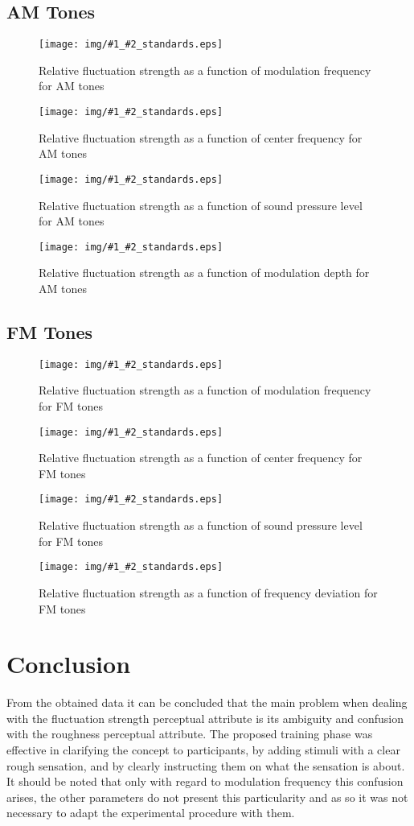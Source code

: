 \documentclass[a4paper]{article}
\newcommand{\figStds}[3]{
\begin{figure}[ht!]
  \centering
  \texttt{[image: img/\#1\_\#2\_standards.eps]}
  \caption{#3}
\label{fig:#1-#2}
\end{figure}
}
\begin{document}
\subsection{AM Tones} %
\label{subsec:results_am_tones}

\figStds{AM-fm}
  {all}
  {Relative fluctuation strength as a function of modulation frequency for AM
  tones}

\figStds{AM-fc}
  {all}
  {Relative fluctuation strength as a function of center frequency for AM
  tones}

\figStds{AM-SPL}
  {all}
  {Relative fluctuation strength as a function of sound pressure level for AM
  tones}

\figStds{AM-md}
  {all}
  {Relative fluctuation strength as a function of modulation depth for AM
  tones}


\subsection{FM Tones} %
\label{subsec:results_fm_tones}

\figStds{FM-fm}
  {all}
  {Relative fluctuation strength as a function of modulation frequency for FM
  tones}

\figStds{FM-fc}
  {all}
  {Relative fluctuation strength as a function of center frequency for FM
  tones}

\figStds{FM-SPL}
  {all}
  {Relative fluctuation strength as a function of sound pressure level for FM
  tones}

\figStds{FM-df}
  {all}
  {Relative fluctuation strength as a function of frequency deviation for FM
  tones}



\section{Conclusion} %
\label{sec:conclusion}

From the obtained data it can be concluded that the main problem when dealing
with the fluctuation strength perceptual attribute is its ambiguity and
confusion with the roughness perceptual attribute. The proposed training phase
was effective in clarifying the concept to participants, by adding stimuli with
a clear rough sensation, and by clearly instructing them on what the sensation
is about. It should be noted that only with regard to modulation frequency this
confusion arises, the other parameters do not present this particularity and as
so it was not necessary to adapt the experimental procedure with them.
\end{document}

